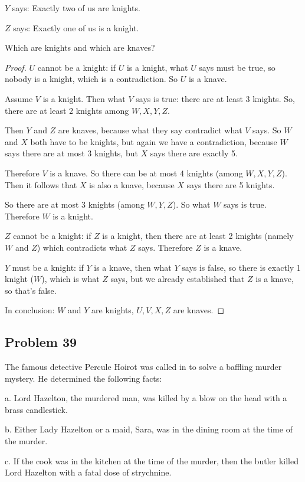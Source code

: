 \documentclass[14pt]{extarticle}
\begin{document}
$Y$ says: Exactly two of us are knights.

$Z$ says: Exactly one of us is a knight.

Which are knights and which are knaves?

\begin{proof}
$U$ cannot be a knight: if $U$ is a knight, what $U$ says must be true, so
nobody is a knight, which is a contradiction. So $U$ is a knave.

Assume $V$ is a knight. Then what $V$ says is true: there are at least 3
knights. So, there are at least 2 knights among $W, X, Y, Z$.

Then $Y$ and $Z$ are knaves, because what they say contradict what $V$ says. So
$W$ and $X$ both have to be knights, but again we have a contradiction, because
$W$ says there are at most 3 knights, but $X$ says there are exactly 5.

Therefore $V$ is a knave. So there can be at most 4 knights (among $W, X, Y,
Z$). Then it follows that $X$ is also a knave, because $X$ says there are 5
knights.

So there are at most 3 knights (among $W, Y, Z$). So what $W$ says is true.
Therefore $W$ is a knight.

$Z$ cannot be a knight: if $Z$ is a knight, then there are at least 2 knights
(namely $W$ and $Z$) which contradicts what $Z$ says. Therefore $Z$ is a knave.

$Y$ must be a knight: if $Y$ is a knave, then what $Y$ says is false, so there
is exactly 1 knight ($W$), which is what $Z$ says, but we already established
that $Z$ is a knave, so that's false.

In conclusion: $W$ and $Y$ are knights, $U,V,X,Z$ are knaves.
\end{proof}

\subsection{Problem 39}
The famous detective Percule Hoirot was called in to solve a baffling murder
mystery. He determined the following facts:

a. Lord Hazelton, the murdered man, was killed by a blow on the head with a
brass candlestick.

b. Either Lady Hazelton or a maid, Sara, was in the dining room at the time of
the murder.

c. If the cook was in the kitchen at the time of the murder, then the butler
killed Lord Hazelton with a fatal dose of strychnine.
\end{document}
